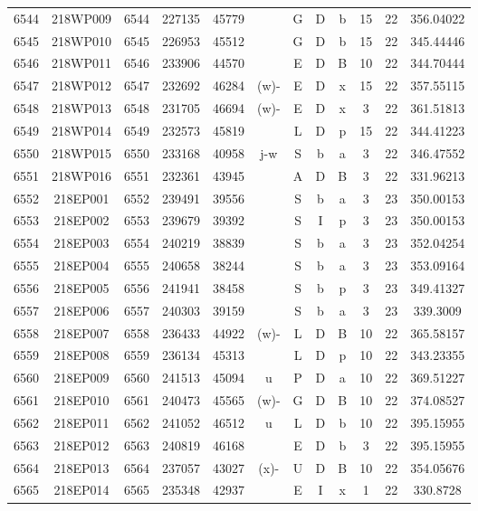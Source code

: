 \begin{tabular}{|*{12}{c|}}
6544 & 218WP009 & 6544 & 227135 & 45779 &  & G & D & b & 15 & 22 & 356.04022 \\ 
6545 & 218WP010 & 6545 & 226953 & 45512 &  & G & D & b & 15 & 22 & 345.44446 \\ 
6546 & 218WP011 & 6546 & 233906 & 44570 &  & E & D & B & 10 & 22 & 344.70444 \\ 
6547 & 218WP012 & 6547 & 232692 & 46284 & (w)- & E & D & x & 15 & 22 & 357.55115 \\ 
6548 & 218WP013 & 6548 & 231705 & 46694 & (w)- & E & D & x & 3 & 22 & 361.51813 \\ 
6549 & 218WP014 & 6549 & 232573 & 45819 &  & L & D & p & 15 & 22 & 344.41223 \\ 
6550 & 218WP015 & 6550 & 233168 & 40958 & j-w & S & b & a & 3 & 22 & 346.47552 \\ 
6551 & 218WP016 & 6551 & 232361 & 43945 &  & A & D & B & 3 & 22 & 331.96213 \\ 
6552 & 218EP001 & 6552 & 239491 & 39556 &  & S & b & a & 3 & 23 & 350.00153 \\ 
6553 & 218EP002 & 6553 & 239679 & 39392 &  & S & I & p & 3 & 23 & 350.00153 \\ 
6554 & 218EP003 & 6554 & 240219 & 38839 &  & S & b & a & 3 & 23 & 352.04254 \\ 
6555 & 218EP004 & 6555 & 240658 & 38244 &  & S & b & a & 3 & 23 & 353.09164 \\ 
6556 & 218EP005 & 6556 & 241941 & 38458 &  & S & b & p & 3 & 23 & 349.41327 \\ 
6557 & 218EP006 & 6557 & 240303 & 39159 &  & S & b & a & 3 & 23 & 339.3009 \\ 
6558 & 218EP007 & 6558 & 236433 & 44922 & (w)- & L & D & B & 10 & 22 & 365.58157 \\ 
6559 & 218EP008 & 6559 & 236134 & 45313 &  & L & D & p & 10 & 22 & 343.23355 \\ 
6560 & 218EP009 & 6560 & 241513 & 45094 & u & P & D & a & 10 & 22 & 369.51227 \\ 
6561 & 218EP010 & 6561 & 240473 & 45565 & (w)- & G & D & B & 10 & 22 & 374.08527 \\ 
6562 & 218EP011 & 6562 & 241052 & 46512 & u & L & D & b & 10 & 22 & 395.15955 \\ 
6563 & 218EP012 & 6563 & 240819 & 46168 &  & E & D & b & 3 & 22 & 395.15955 \\ 
6564 & 218EP013 & 6564 & 237057 & 43027 & (x)- & U & D & B & 10 & 22 & 354.05676 \\ 
6565 & 218EP014 & 6565 & 235348 & 42937 &  & E & I & x & 1 & 22 & 330.8728 \\ 

\end{tabular}
